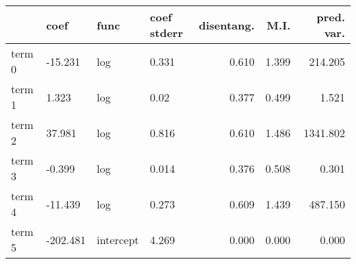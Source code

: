 \documentclass{article}%
\begin{document}
\begin{table}[H]%
\centering%
\footnotesize%
\begin{tabular}{llllrrr}
\toprule
{} &      coef &       func & coef stderr &  disentang. &   M.I. &  pred. var. \\
\midrule
term 0 &   -15.231 &        log &       0.331 &       0.610 &  1.399 &     214.205 \\
term 1 &     1.323 &        log &        0.02 &       0.377 &  0.499 &       1.521 \\
term 2 &    37.981 &        log &       0.816 &       0.610 &  1.486 &    1341.802 \\
term 3 &    -0.399 &        log &       0.014 &       0.376 &  0.508 &       0.301 \\
term 4 &   -11.439 &        log &       0.273 &       0.609 &  1.439 &     487.150 \\
term 5 &  -202.481 &  intercept &       4.269 &       0.000 &  0.000 &       0.000 \\
\bottomrule
\end{tabular}
%
\end{table}

%
\vfill \pagebreak

%
\end{document}

